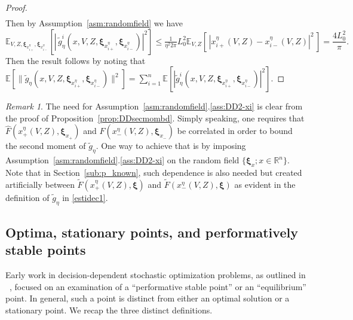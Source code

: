 \documentclass[11pt,reqno]{amsart}
\newcommand{\1}{{\bf 1}}
\newcommand{\2}{{\bf 2}}
\newcommand{\us}[1]{\textcolor{red}{#1}}
\newcommand{\bxi}{\boldsymbol{\xi}}
\newcommand{\R}{\mathbb R}
\numberwithin{equation}{section}
\theoremstyle{remark}
\newtheorem{remark}{Remark}[section]
\begin{document}
{\begin{proof}
\begin{align*}
				\end{align*}
				Then by Assumption~\ref{asm:randomfield} we have
				$$
				\mathbb{E}_{V,Z,\bxi_{x_{i+}^\eta},\bxi_{x_{i-}^\eta}}\left[\left|\, \tilde g_{\eta}^i\left(x,V,Z,\bxi_{x_{i+}^\eta},\bxi_{x_{i-}^\eta}\right)\right|^2\right]
				\leq \tfrac{1}{\eta^2 2\pi}L_0^2 \mathbb{E}_{V,Z} \left[\, \left|x_{i+}^\eta(V,Z)-x_{i-}^\eta(V,Z)\right|^2 \, \right] =\frac{4L_0^2}{\pi}.
				$$
				Then the result follows by noting that $\mathbb{E}[\|\tilde{g}_{\eta}(x,V,Z,\bxi_{x_{i+}^\eta},\bxi_{x_{i-}^\eta})\|^2]=\sum_{i=1}^n \mathbb{E}[|\tilde{g}_{\eta}^i(x,V,Z,\bxi_{x_{i+}^\eta},\bxi_{x_{i-}^\eta})|^2]$.
				
				\end{proof}
				
				\begin{remark}
					The need for Assumption~\ref{asm:randomfield}.\ref{ass:DD2-xi} is clear from the proof of Proposition~\ref{prop:DDsecmombd}. Simply speaking, one requires that $\hat{F}(x_{+}^{\eta}(V,Z),\bxi_{x_{+}})$ and $\hat{F}(x_{-}^{\eta}(V,Z),\bxi_{x_{-}})$ be correlated in order to bound the second moment of $\tilde g_{\eta}$. One way to achieve that is by imposing Assumption~\ref{asm:randomfield}.\ref{ass:DD2-xi} on the random field $\{\bxi_x; x \in \R^n\}$. Note that in Section~\ref{sub:p_known}, such dependence is also needed but created artificially between $\tilde F(x_{+}^{\eta}(V,Z), \bxi)$ and $\tilde F(x_{-}^{\eta}(V,Z), \bxi)$ as evident in the definition of $\tilde g_{\eta}$ in \eqref{estidec1}. 
				\end{remark}
				
				\subsection{Optima, stationary points, and performatively stable points}
				Early work in decision-dependent stochastic optimization problems, as outlined in ~\cite{drusvyatskiy2023stochastic, perdomo2020performative}, focused on an examination of a  ``performative stable point'' or an ``equilibrium'' point.  In general, such a point is distinct from either an optimal solution or a stationary point.  We recap the three distinct  definitions.
				
}
\end{document}
